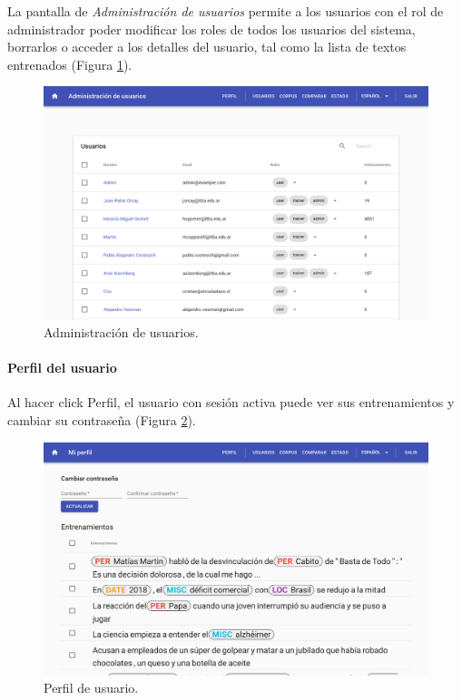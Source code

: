 \documentclass[12pt,a4paper,]{scrartcl}
\let\oldparagraph\paragraph
\renewcommand{\paragraph}[1]{\oldparagraph{#1}\mbox{}}
\begin{document}
La pantalla de \emph{Administración de usuarios} permite a los usuarios con el rol de administrador poder modificar los roles de todos los usuarios del sistema, borrarlos o acceder a los detalles del usuario, tal como la lista de textos entrenados (Figura \ref{fig:logic-user-list}).

\begin{figure}[H]

{\centering \includegraphics{assets/logic/user-list.pdf} 

}

\caption{Administración de usuarios.}\label{fig:logic-user-list}
\end{figure}

\hypertarget{perfil-del-usuario}{%
\paragraph{Perfil del usuario}\label{perfil-del-usuario}}

Al hacer click Perfil, el usuario con sesión activa puede ver sus entrenamientos y cambiar su contraseña (Figura \ref{fig:logic-user-profile}).

\begin{figure}[H]

{\centering \includegraphics{assets/logic/user-profile.pdf} 

}

\caption{Perfil de usuario.}\label{fig:logic-user-profile}
\end{figure}
\end{document}
